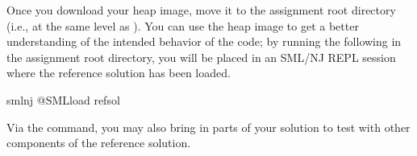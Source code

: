 \documentclass[11pt]{article}
\begin{document}
Once you download your heap image, move it to the assignment root directory (i.e., at the same level as ).
You can use the heap image to get a better understanding of the intended behavior of the code; by running the following in the assignment root directory, you will be placed in an SML/NJ REPL session where the reference solution has been loaded.
\begin{codeblock}
  smlnj @SMLload refsol
\end{codeblock}
Via the  command, you may also bring in parts of your solution to test with other components of the reference solution.
\end{document}
